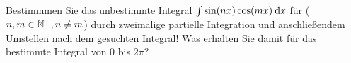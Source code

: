 \item Bestimmmen Sie das unbestimmte Integral $\int \sin(nx)\cos(mx)\:\mathrm{d}{x}$ für ($n,m\in\mathbb{N}^{+}, n \ne m$) durch zweimalige partielle Integration und anschließendem Umstellen nach dem gesuchten Integral! Was erhalten Sie damit für das bestimmte Integral von $0$ bis $2\pi$? 
